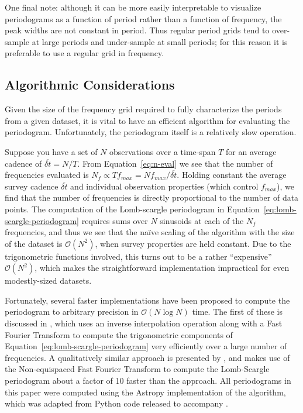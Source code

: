 \documentclass[preprint]{aastex}
\newcommand{\Eq}[1]{Equation~\ref{eq:#1}}
\newcommand{\eq}[1]{\Eq{#1}}
\newcommand{\sectlabel}[1]{\label{sect:#1}}
\begin{document}
One final note: although it can be more easily interpretable to
visualize periodograms as a function of period rather than a function of
frequency, the peak widths are not constant in period.
Thus regular period grids tend to over-sample at large periods and under-sample
at small periods;
for this reason it is preferable to use a regular grid in frequency.




\subsection{Algorithmic Considerations}
\sectlabel{algorithmic-considerations}
Given the size of the frequency grid required to fully characterize the periods
from a given dataset, it is vital to have an efficient algorithm for evaluating
the periodogram. Unfortunately, the periodogram itself is a relatively slow
operation.

Suppose you have a set of $N$ observations over a time-span $T$ for an average
cadence of $\overline{\delta t} = N/T$.
From \eq{n-eval} we see that the number of frequencies evaluated is
$N_f \propto T f_{max} = N f_{max} / \overline{\delta t}$.
Holding constant the average survey cadence $\overline{\delta t}$ and individual
observation properties (which control $f_{max}$), we find that the number of
frequencies is directly proportional to the number of data points.
The computation of the Lomb-scargle periodogram in \eq{lomb-scargle-periodogram}
requires sums over $N$ sinusoids at each of the
$N_f$ frequencies, and thus we see that the
na{\"i}ve scaling of the algorithm with the size of the dataset is
$\mathcal{O}(N^2)$, when survey properties are held constant.
Due to the trigonometric functions involved, this turns out to be a rather
``expensive'' $\mathcal{O}(N^2)$, which makes the straightforward
implementation impractical for even modestly-sized datasets.

Fortunately, several faster implementations have been proposed to compute the
periodogram to arbitrary precision in $\mathcal{O}(N\log N)$ time.
The first of these is discussed in \citet{Press89}, which uses an inverse
interpolation operation along with a Fast Fourier Transform to compute the
trigonometric components of \eq{lomb-scargle-periodogram} very efficiently over
a large number of frequencies.
A qualitatively similar approach is presented by \citet{Leroy2012},
and makes use of the Non-equispaced Fast Fourier Transform
\citep[NFFT, see][]{Keiner2009} to compute the Lomb-Scargle periodogram about
a factor of 10 faster than the \citet{Press89} approach.
All periodograms in this paper were computed using the Astropy
implementation of the \citet{Press89} algorithm, which was adapted from Python
code released to accompany \citet{VanderPlas2015}.
\end{document}
